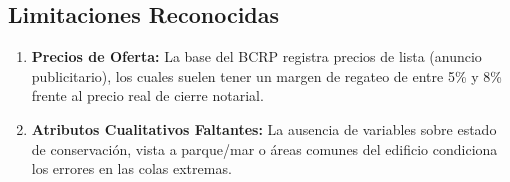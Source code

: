 \documentclass[11pt,a4paper]{article}
\begin{document}
\subsection{Limitaciones Reconocidas}
\begin{enumerate}
    \item \textbf{Precios de Oferta:} La base del BCRP registra precios de lista (anuncio publicitario), los cuales suelen tener un margen de regateo de entre 5\% y 8\% frente al precio real de cierre notarial.
    \item \textbf{Atributos Cualitativos Faltantes:} La ausencia de variables sobre estado de conservación, vista a parque/mar o áreas comunes del edificio condiciona los errores en las colas extremas.
\end{enumerate}
\end{document}
